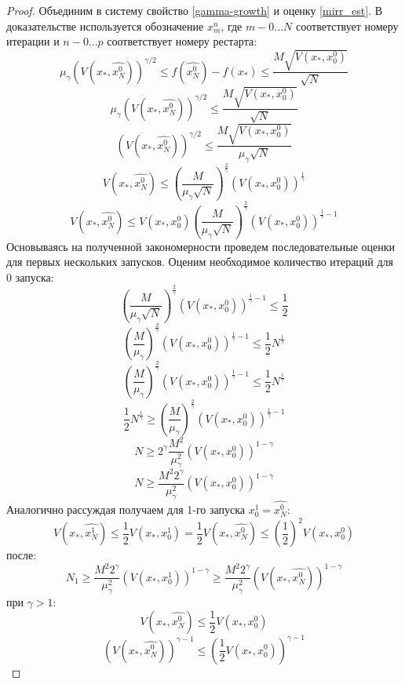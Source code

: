     \begin{proof}
       Объединим в систему свойство \eqref{gamma-growth} и оценку \eqref{mirr_est}. В доказательстве используется обозначение $x_m^n$, где $m - 0...N$ соответствует номеру итерации и $n - 0...p$ соответствует номеру рестарта: 
       $$
           \mu_{\gamma}(V(x_*, \widehat{x_N^0}))^{\gamma/2} \leq f(\widehat{x_N^0}) - f(x_*) \leq \frac{M\sqrt{V(x_*, x_0^0)}}{\sqrt{N}}
       $$
       $$
           \mu_{\gamma}(V(x_*, \widehat{x_N^0}))^{\gamma/2} \leq \frac{M\sqrt{V(x_*, x_0^0)}}{\sqrt{N}}
       $$
       $$
           (V(x_*, \widehat{x_N^0}))^{\gamma/2} \leq \frac{M\sqrt{V(x_*, x_0^0)}}{\mu_{\gamma}\sqrt{N}}
       $$
       $$
           V(x_*, \widehat{x_N^0}) \leq (\frac{M}{\mu_{\gamma}\sqrt{ N}})^{\frac{2}{\gamma}} (V(x_*, x_0^0))^{\frac{1}{\gamma}}
       $$
       $$
           V(x_*, \widehat{x_N^0}) \leq V(x_*, x_0^0) (\frac{M}{\mu_{\gamma}\sqrt{N}})^{\frac{2}{\gamma}} (V(x_*, x_0^0))^{\frac{1}{\gamma} - 1}
       $$
       Основываясь на полученной закономерности проведем последовательные оценки для первых нескольких запусков. Оценим необходимое количество итераций для 0 запуска:
       $$
           (\frac{M}{\mu_{\gamma}\sqrt{N}})^{\frac{2}{\gamma}} (V(x_*, x_0^0))^{\frac{1}{\gamma} - 1} \leq \frac{1}{2} 
       $$
       $$
           (\frac{M}{\mu_{\gamma}})^{\frac{2}{\gamma}} (V(x_*, x_0^0))^{\frac{1}{\gamma} - 1} \leq \frac{1}{2} N^{\frac{1}{\gamma}} 
       $$
       $$
           (\frac{M}{\mu_{\gamma}})^{\frac{2}{\gamma}} (V(x_*, x_0^0))^{\frac{1}{\gamma} - 1} \leq \frac{1}{2} N^{\frac{1}{\gamma}} 
       $$
       $$
           \frac{1}{2} N^{\frac{1}{\gamma}} \geq (\frac{M}{\mu_{\gamma}})^{\frac{2}{\gamma}} (V(x_*, x_0^0))^{\frac{1}{\gamma} - 1}  
       $$
       $$
           N \geq 2 ^ {\gamma} \frac{M^2}{\mu_{\gamma}^2} (V(x_*, x_0^0))^{1 - \gamma}  
       $$
       $$
           N \geq \frac{M^2 2^{\gamma}}{\mu_{\gamma}^2} (V(x_*, x_0^0))^{1 - \gamma}  
       $$
       Аналогично рассуждая получаем для 1-го запуска $x_0^1 = \widehat{x_N^0}$:
       $$
           V(x_*, \widehat{x_N^1}) \leq \frac{1}{2} V(x_*, x_0^1) = \frac{1}{2} V(x_*, \widehat{x_N^0}) \leq (\frac{1}{2})^2 V(x_*, x_0^0) 
       $$
       после:
       $$
           N_1 \geq \frac{M^2 2^{\gamma}}{\mu_{\gamma}^2} (V(x_*, x_0^1))^{1 - \gamma} \geq \frac{M^2 2^{\gamma}}{\mu_{\gamma}^2} (V(x_*, \widehat{x_N^0}))^{1 - \gamma} 
       $$
       при $\gamma > 1$:
       $$
           V(x_*, \widehat{x_N^0}) \leq \frac{1}{2}V(x_*, x_0^0)  
       $$
       $$
           (V(x_*, \widehat{x_N^0}))^{\gamma - 1} \leq (\frac{1}{2} V(x_*, x_0^0))^{\gamma - 1}
$$
\end{proof}
